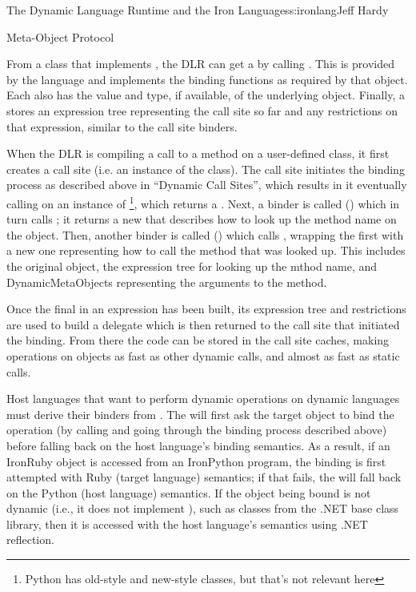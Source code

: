 \begin{aosachapter}{The Dynamic Language Runtime and the Iron Languages}{s:ironlang}{Jeff Hardy}
\begin{aosasect1}{Meta-Object Protocol}

From a class that implements , the DLR can get
a  by calling . This
 is provided by the language and implements the binding
functions as required by that object. Each  also has
the value and type, if available, of the underlying object. Finally, a
 stores an expression tree representing the call site
so far and any restrictions on that expression, similar to the call site
binders. 

When the DLR is compiling a call to a method on a user-defined class, it first
creates a call site (i.e. an instance of the  class). The call
site initiates the binding process as described above in ``Dynamic Call
Sites'', which results in it eventually calling  on an
instance of \footnote{Python has old-style and new-style
classes, but that's not relevant here}, which returns a .
Next, a binder is called () which in turn
calls ; it returns a new
 that describes how to look up the method name on the
object. Then, another binder is called () which
calls , wrapping the first
 with a new one representing how to call the method
that was looked up. This includes the original object, the expression tree for
looking up the mthod name, and DynamicMetaObjects representing the arguments to
the method.

Once the final  in an expression has been built, its
expression tree and restrictions are used to build a delegate which is then
returned to the call site that initiated the binding. From there the code can
be stored in the call site caches, making operations on objects as fast as
other dynamic calls, and almost as fast as static calls.

Host languages that want to perform dynamic operations on dynamic languages
must derive their binders from . The
 will first ask the target object to bind the
operation (by calling  and going through the binding
process described above) before falling back on the host language's binding
semantics. As a result, if an IronRuby object is accessed from an IronPython
program, the binding is first attempted with Ruby (target language) semantics;
if that fails, the  will fall back on the Python
(host language) semantics. If the object being bound is not dynamic (i.e., it
does not implement ), such as classes from the
.NET base class library, then it is accessed with the host language's semantics
using .NET reflection.


\end{aosasect1}
\end{aosachapter}
